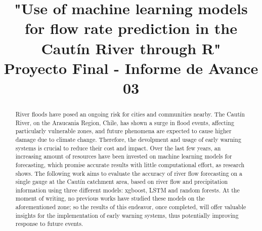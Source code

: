\documentclass[hess, manuscript]{copernicus}
\begin{document}
\title{"Use of machine learning models for flow rate prediction in the Cautín River through R" \\
Proyecto Final - Informe de Avance 03}











\received{}
\pubdiscuss{} %
\revised{}
\accepted{}
\published{}



\maketitle

\begin{abstract}
  River floods have posed an ongoing risk for cities and communities nearby. The Cautín River, on the Araucania Region, Chile, has shown a surge in flood events, affecting particularly vulnerable zones, and future phenomena are expected to cause higher damage due to climate change. Therefore, the devolpment and usage of early warning systems is crucial to reduce their cost and impact. Over the last few years, an increasing amount of resources have been invested on machine learning models for forecasting, which promise accurate results with little computational effort, as research shows. The following work aims to evaluate the accuracy of river flow forecasting on a single gauge at the Cautín catchment area, based on river flow and precipitation information using three different models: xgboost, LSTM and random forests. At the moment of writing, no previous works have studied these models on the aforementioned zone; so the results of this endeavor, once completed, will offer valuable insights for the implementation of early warning systems, thus potentially improving response to future events.
\end{abstract}
\end{document}
